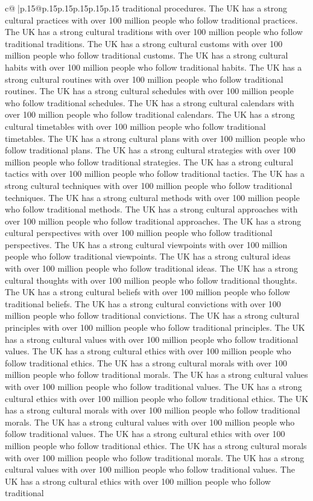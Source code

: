 \documentclass{article}
\begin{document}
{\begin{supertabular}{c@{$\;$}|p{.15\linewidth}@{}p{.15\linewidth}p{.15\linewidth}p{.15\linewidth}p{.15\linewidth}p{.15\linewidth}}
{{{traditional procedures. The UK has a strong cultural practices with over 100 million people who follow traditional practices. The UK has a strong cultural traditions with over 100 million people who follow traditional traditions. The UK has a strong cultural customs with over 100 million people who follow traditional customs. The UK has a strong cultural habits with over 100 million people who follow traditional habits. The UK has a strong cultural routines with over 100 million people who follow traditional routines. The UK has a strong cultural schedules with over 100 million people who follow traditional schedules. The UK has a strong cultural calendars with over 100 million people who follow traditional calendars. The UK has a strong cultural timetables with over 100 million people who follow traditional timetables. The UK has a strong cultural plans with over 100 million people who follow traditional plans. The UK has a strong cultural strategies with over 100 million people who follow traditional strategies. The UK has a strong cultural tactics with over 100 million people who follow traditional tactics. The UK has a strong cultural techniques with over 100 million people who follow traditional techniques. The UK has a strong cultural methods with over 100 million people who follow traditional methods. The UK has a strong cultural approaches with over 100 million people who follow traditional approaches. The UK has a strong cultural perspectives with over 100 million people who follow traditional perspectives. The UK has a strong cultural viewpoints with over 100 million people who follow traditional viewpoints. The UK has a strong cultural ideas with over 100 million people who follow traditional ideas. The UK has a strong cultural thoughts with over 100 million people who follow traditional thoughts. The UK has a strong cultural beliefs with over 100 million people who follow traditional beliefs. The UK has a strong cultural convictions with over 100 million people who follow traditional convictions. The UK has a strong cultural principles with over 100 million people who follow traditional principles. The UK has a strong cultural values with over 100 million people who follow traditional values. The UK has a strong cultural ethics with over 100 million people who follow traditional ethics. The UK has a strong cultural morals with over 100 million people who follow traditional morals. The UK has a strong cultural values with over 100 million people who follow traditional values. The UK has a strong cultural ethics with over 100 million people who follow traditional ethics. The UK has a strong cultural morals with over 100 million people who follow traditional morals. The UK has a strong cultural values with over 100 million people who follow traditional values. The UK has a strong cultural ethics with over 100 million people who follow traditional ethics. The UK has a strong cultural morals with over 100 million people who follow traditional morals. The UK has a strong cultural values with over 100 million people who follow traditional values. The UK has a strong cultural ethics with over 100 million people who follow traditional }}}
\end{supertabular}}
\end{document}
